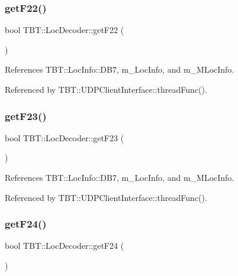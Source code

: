 \subsubsection{\texorpdfstring{get\+F22()}{getF22()}}
{\footnotesize\ttfamily bool T\+B\+T\+::\+Loc\+Decoder\+::get\+F22 (\begin{DoxyParamCaption}{ }\end{DoxyParamCaption})\hspace{0.3cm}{\ttfamily [inline]}}



References T\+B\+T\+::\+Loc\+Info\+::\+D\+B7, m\+\_\+\+Loc\+Info, and m\+\_\+\+M\+Loc\+Info.



Referenced by T\+B\+T\+::\+U\+D\+P\+Client\+Interface\+::thread\+Func().

\mbox{\label{classTBT_1_1LocDecoder_ab03cf89a7d635e61ebb1362f5f8274fc_ab03cf89a7d635e61ebb1362f5f8274fc}} 
\subsubsection{\texorpdfstring{get\+F23()}{getF23()}}
{\footnotesize\ttfamily bool T\+B\+T\+::\+Loc\+Decoder\+::get\+F23 (\begin{DoxyParamCaption}{ }\end{DoxyParamCaption})\hspace{0.3cm}{\ttfamily [inline]}}



References T\+B\+T\+::\+Loc\+Info\+::\+D\+B7, m\+\_\+\+Loc\+Info, and m\+\_\+\+M\+Loc\+Info.



Referenced by T\+B\+T\+::\+U\+D\+P\+Client\+Interface\+::thread\+Func().

\mbox{\label{classTBT_1_1LocDecoder_a16317eca85676a89372298782c71c6cb_a16317eca85676a89372298782c71c6cb}} 
\subsubsection{\texorpdfstring{get\+F24()}{getF24()}}
{\footnotesize\ttfamily bool T\+B\+T\+::\+Loc\+Decoder\+::get\+F24 (\begin{DoxyParamCaption}{ }\end{DoxyParamCaption})\hspace{0.3cm}{\ttfamily [inline]}}



